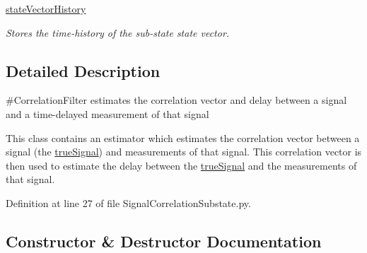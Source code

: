 \begin{DoxyCompactItemize}
\hyperlink{classSubStates_1_1SubState_a24bf2de56fc3037d91cba43d28f3bf60}{state\+Vector\+History}
\begin{DoxyCompactList}\small\item\em Stores the time-\/history of the sub-\/state state vector. \end{DoxyCompactList}\end{DoxyCompactItemize}


\subsection{Detailed Description}
\#\+Correlation\+Filter estimates the correlation vector and delay between a signal and a time-\/delayed measurement of that signal 

This class contains an estimator which estimates the correlation vector between a signal (the \hyperlink{classSignalCorrelationSubstate_1_1CorrelationFilter_a67ff75effd8a8a7e34f0f3e8c56ef491}{true\+Signal}) and measurements of that signal. This correlation vector is then used to estimate the delay between the \hyperlink{classSignalCorrelationSubstate_1_1CorrelationFilter_a67ff75effd8a8a7e34f0f3e8c56ef491}{true\+Signal} and the measurements of that signal. 

Definition at line 27 of file Signal\+Correlation\+Substate.\+py.



\subsection{Constructor \& Destructor Documentation}
